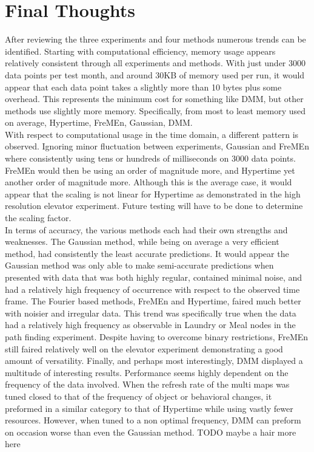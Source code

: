 \section{ Final Thoughts }

After reviewing the three experiments and four methods numerous trends can be
identified. Starting with computational efficiency, memory usage appears
relatively consistent through all experiments and methods. With just under 3000
data points per test month, and around 30KB of memory used per run,
it would appear that each data point takes a slightly more than 10 bytes plus
some overhead. This represents the minimum cost for something like DMM, but
other methods use slightly more memory. Specifically, from most to least memory
used on average, Hypertime, FreMEn, Gaussian, DMM. \\

With respect to computational usage in the time domain, a different pattern is
observed. Ignoring minor fluctuation between experiments, Gaussian and FreMEn
where consistently using tens or hundreds of milliseconds on 3000 data points.
FreMEn would then be using an order of magnitude more, and Hypertime yet another
order of magnitude more. Although this is the average case, it would appear that
the scaling is not linear for Hypertime as demonstrated in the high resolution
elevator experiment. Future testing will have to be done to determine the
scaling factor. \\

In terms of accuracy, the various methods each had their own strengths and
weaknesses. The Gaussian method, while being on average a very efficient
method, had consistently the least accurate predictions. It would appear the
Gaussian method was only able to make semi-accurate predictions when presented
with data that was both highly regular, contained minimal noise, and had a
relatively high frequency of occurrence with respect to the observed time
frame. The Fourier based methods, FreMEn and Hypertime, faired much better
with noisier and irregular data. This trend was specifically true when the data
had a relatively high frequency as observable in Laundry or Meal nodes in the
path finding experiment. Despite having to overcome binary restrictions, FreMEn
still faired relatively well on the elevator experiment demonstrating a good
amount of versatility. Finally, and perhaps most interestingly, DMM
displayed a multitude of interesting results. Performance seems highly dependent
on the frequency of the data involved. When the refresh rate of the multi maps
was tuned closed to that of the frequency of object or behavioral changes, it
preformed in a similar category to that of Hypertime while using vastly fewer
resources. However, when tuned to a non optimal frequency, DMM can preform
on occasion worse than even the Gaussian method. TODO maybe a hair more here


